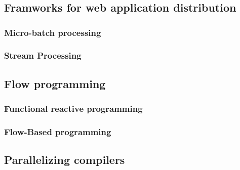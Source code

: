 \chapter{}





\section{Framworks for web application distribution}
\subsection{Micro-batch processing}
\subsection{Stream Processing}

\section{Flow programming}
\subsection{Functional reactive programming}
\subsection{Flow-Based programming}

\section{Parallelizing compilers}

\section{}


                                    \endinput






https://medium.com/@benorama/the-evolution-of-software-architecture-bd6ea674c477

https://en.wikipedia.org/wiki/Dataflow
https://en.wikipedia.org/wiki/Real-time_computing
https://en.wikipedia.org/wiki/Partitioned_global_address_space
https://en.wikipedia.org/wiki/SPMD

Albert Cohen
https://scholar.google.com/citations?user=MkKZKAMAAAAJ&hl=en

+ Paul Feautrier (Tutor of A. Cohen)